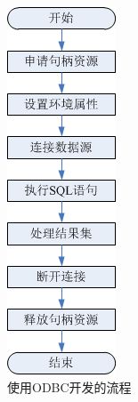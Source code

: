 \documentclass[lang=cn,11pt,a4paper,cite=authornum]{paper}
\begin{document}
\begin{figure}[htbp]
{\begin{minipage}[t]{0.2\linewidth}
            \includegraphics[width=\textwidth]{./Images/flow_huawei.png}
        \end{minipage}
    }
    \caption{使用ODBC开发的流程\label{fig:flow}}
\end{figure}
\end{document}
